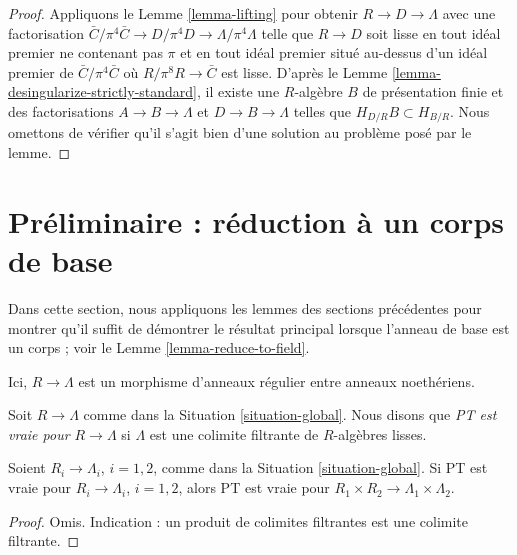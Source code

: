 \begin{proof}
Appliquons le Lemme \ref{lemma-lifting} pour obtenir $R \to D \to \Lambda$
avec une factorisation
$\bar C/\pi^4\bar C \to D/\pi^4 D \to \Lambda/\pi^4\Lambda$
telle que $R \to D$ soit lisse en tout idéal premier ne contenant pas $\pi$
et en tout idéal premier situé au-dessus d'un idéal premier de $\bar C/\pi^4\bar C$
où $R/\pi^8 R \to \bar C$ est lisse.
D'après le Lemme \ref{lemma-desingularize-strictly-standard},
il existe une $R$-algèbre $B$ de présentation finie et des
factorisations $A \to B \to \Lambda$ et $D \to B \to \Lambda$
telles que $H_{D/R}B \subset H_{B/R}$. Nous omettons de vérifier qu'il
s'agit bien d'une solution au problème posé par le lemme.
\end{proof}












\section{Préliminaire : réduction à un corps de base}
\label{section-reduction}

\noindent
Dans cette section, nous appliquons les lemmes des sections précédentes
pour montrer qu'il suffit de démontrer le résultat principal lorsque l'anneau
de base est un corps ; voir le Lemme \ref{lemma-reduce-to-field}.

\begin{situation}
\label{situation-global}
Ici, $R \to \Lambda$ est un morphisme d'anneaux régulier entre anneaux noethériens.
\end{situation}

\noindent
Soit $R \to \Lambda$ comme dans la Situation \ref{situation-global}.
Nous disons que {\it PT est vraie pour $R \to \Lambda$} si $\Lambda$ est une
colimite filtrante de $R$-algèbres lisses.

\begin{lemma}
\label{lemma-product}
Soient $R_i \to \Lambda_i$, $i = 1, 2$, comme dans la Situation \ref{situation-global}.
Si PT est vraie pour $R_i \to \Lambda_i$, $i = 1, 2$, alors PT est vraie pour
$R_1 \times R_2 \to \Lambda_1 \times \Lambda_2$.
\end{lemma}

\begin{proof}
Omis. Indication : un produit de colimites filtrantes est une colimite filtrante.
\end{proof}

